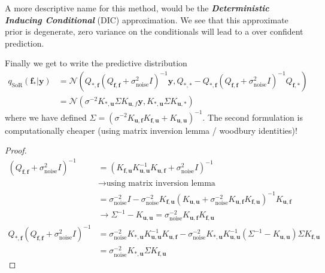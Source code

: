 \documentclass[10pt]{elegantbook}
\newcommand{\mydefination}[1]{\textbf{\textit{\textcolor{structurecolor}{#1}}}}
\begin{document}
A more descriptive name for this method, would be the
\mydefination{Deterministic Inducing Conditional} (DIC) approximation. We see that this approximate prior is
degenerate, zero variance on the conditionals will lead to a over confident prediction.

Finally we get to write the predictive distribution
\begin{equation}
    \begin{aligned}
    q_{\text{SoR}}(\mathbf f_* | \mathbf y) &= \mathcal N \left (
        Q_{*, \mathbf f} (Q_{\mathbf f, \mathbf f} + \sigma_{\text{noise}}^2 I)^{-1} \mathbf y,
        Q_{*, *} - Q_{*, \mathbf f} (Q_{\mathbf f, \mathbf f} + \sigma_{\text{noise}}^2 I)^{-1} Q_{\mathbf f, *}
        \right ) \\
        &= \mathcal N \left (
            \sigma^{-2} K_{*, \mathbf u} \Sigma K_{\mathbf u, f} \mathbf y,
            K_{*, \mathbf u} \Sigma K_{\mathbf u, *}
            \right )
    \end{aligned}
\end{equation}
where we have defined $\Sigma = (\sigma^{-2} K_{\mathbf u, \mathbf f} K_{\mathbf f, \mathbf u} + K_{\mathbf u, \mathbf u})^{-1}$. The 
second formulation is computationally cheaper (using matrix inversion lemma / woodbury identities)!

\begin{proof}
    \[
    \begin{aligned}
        (Q_{\mathbf f, \mathbf f} + \sigma_{\text{noise}}^2 I)^{-1} 
        &= (K_{\mathbf{f, u}} K_{\mathbf{u, u}}^{-1} K_{\mathbf{u, f}} + \sigma_{\text{noise}}^2 I)^{-1} \\
        &\rightarrow \text{using matrix inversion lemma} \\
        &= \sigma_{\text{noise}}^{-2} I - \sigma_{\text{noise}}^{-2} K_{\mathbf{f, u}} (K_{\mathbf{u, u}} + \sigma_{\text{noise}}^{-2} K_{\mathbf{u, f}} K_{\mathbf{f, u}})^{-1} K_{\mathbf{u, f}} \\
        &\rightarrow \Sigma^{-1} - K_{\mathbf{u, u}} = \sigma_{\text{noise}}^{-2} K_{\mathbf{u, f}} K_{\mathbf{f, u}} \\
        Q_{*, \mathbf f} (Q_{\mathbf f, \mathbf f} + \sigma_{\text{noise}}^2 I)^{-1}
        &= \sigma_{\text{noise}}^{-2} K_{\mathbf{*, u}} K_{\mathbf{u, u}}^{-1} K_{\mathbf{u, f}} - \sigma_{\text{noise}}^{-2} K_{\mathbf{*, u}} K_{\mathbf{u, u}}^{-1} (\Sigma^{-1} - K_{\mathbf{u, u}}) \Sigma K_{\mathbf{f, u}} \\
        &= \sigma_{\text{noise}}^{-2} K_{\mathbf{*, u}} \Sigma K_{\mathbf{f, u}}
    \end{aligned}
    \]
\end{proof}
\end{document}
